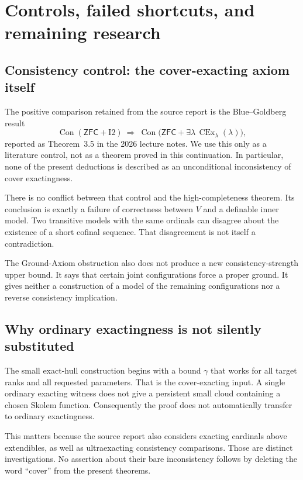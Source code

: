 \documentclass[11pt,letterpaper]{article}
\theoremstyle{definition}
\newcommand{\ZFC}{\mathsf{ZFC}}
\newcommand{\CEx}{\operatorname{CEx}}
\newcommand{\Con}{\operatorname{Con}}
\newcommand{\Itwo}{\mathrm{I2}}
\begin{document}
\section{Controls, failed shortcuts, and remaining research}\label{sec:audit}

\subsection{Consistency control: the cover-exacting axiom itself}

The positive comparison retained from the source report is the Blue--Goldberg result
\[
 \Con(\ZFC+\Itwo)
 \ \Longrightarrow\
 \Con\bigl(\ZFC+\exists\lambda\,\CEx_\lambda(\lambda)\bigr),
\]
reported as Theorem~3.5 in the 2026 lecture notes.\cite{cover} We use this only as a literature control, not as a theorem proved in this continuation. In particular, none of the present deductions is described as an unconditional inconsistency of cover exactingness.

There is no conflict between that control and the high-completeness theorem. Its conclusion is exactly a failure of correctness between $V$ and a definable inner model. Two transitive models with the same ordinals can disagree about the existence of a short cofinal sequence. That disagreement is not itself a contradiction.

The Ground-Axiom obstruction also does not produce a new consistency-strength upper bound. It says that certain joint configurations force a proper ground. It gives neither a construction of a model of the remaining configurations nor a reverse consistency implication.

\subsection{Why ordinary exactingness is not silently substituted}

The small exact-hull construction begins with a bound $\gamma$ that works for all target ranks and all requested parameters. That is the cover-exacting input. A single ordinary exacting witness does not give a persistent small cloud containing a chosen Skolem function. Consequently the proof does not automatically transfer to ordinary exactingness.

This matters because the source report also considers exacting cardinals above extendibles, as well as ultraexacting consistency comparisons. Those are distinct investigations. No assertion about their bare inconsistency follows by deleting the word ``cover'' from the present theorems.
\end{document}
